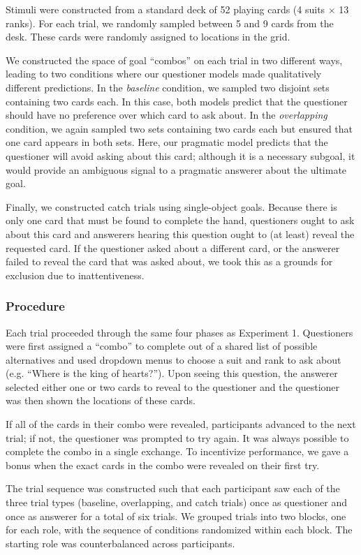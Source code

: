 \documentclass[11pt, floatsintext]{apa6}
\begin{document}
Stimuli were constructed from a standard deck of 52 playing cards (4 suits $\times$ 13 ranks). 
For each trial, we randomly sampled between 5 and 9 cards from the desk. 
These cards were randomly assigned to locations in the grid. 

We constructed the space of goal ``combos'' on each trial in two different ways, leading to two conditions where our questioner models made qualitatively different predictions.
In the \emph{baseline} condition, we sampled two disjoint sets containing two cards each. 
In this case, both models predict that the questioner should have no preference over which card to ask about.
In the \emph{overlapping} condition, we again sampled two sets containing two cards each but ensured that one card appears in both sets. 
Here, our pragmatic model predicts that the questioner will avoid asking about this card; although it is a necessary subgoal, it would provide an ambiguous signal to a pragmatic answerer about the ultimate goal.

Finally, we constructed catch trials using single-object goals. 
Because there is only one card that must be found to complete the hand, questioners ought to ask about this card and answerers hearing this question ought to (at least) reveal the requested card.
If the questioner asked about a different card, or the answerer failed to reveal the card that was asked about, we took this as a grounds for exclusion due to inattentiveness.

\subsubsection{Procedure}

Each trial proceeded through the same four phases as Experiment 1. 
Questioners were first assigned a ``combo'' to complete out of a shared list of possible alternatives and used dropdown menus to choose a suit and rank to ask about (e.g. ``Where is the king of hearts?'').
Upon seeing this question, the answerer selected either one or two cards to reveal to the questioner and the questioner was then shown the locations of these cards.

If all of the cards in their combo were revealed, participants advanced to the next trial; if not, the questioner was prompted to try again.
It was always possible to complete the combo in a single exchange.
To incentivize performance, we gave a bonus when the exact cards in the combo were revealed on their first try. 

The trial sequence was constructed such that each participant saw each of the three trial types (baseline, overlapping, and catch trials) once as questioner and once as answerer for a total of six trials.
We grouped trials into two blocks, one for each role, with the sequence of conditions randomized within each block.
The starting role was counterbalanced across participants.
\end{document}
